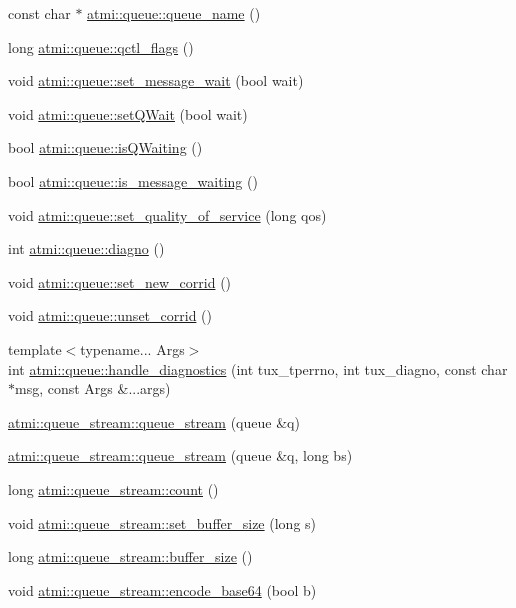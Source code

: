 \begin{DoxyCompactItemize}
\item 
const char $\ast$ \hyperlink{group__atmi_gadaddc33c75ec6e13f6c57da8d979ad32}{atmi\+::queue\+::queue\+\_\+name} ()
\item 
long \hyperlink{group__atmi_ga96f51996c857985c9b8e1b720f726f0c}{atmi\+::queue\+::qctl\+\_\+flags} ()
\item 
void \hyperlink{group__atmi_ga9669776889226a450093d2ddfd921d4b}{atmi\+::queue\+::set\+\_\+message\+\_\+wait} (bool wait)
\item 
void \hyperlink{group__atmi_ga223fac7945fb8d87f04189aa77ce666a}{atmi\+::queue\+::set\+Q\+Wait} (bool wait)
\item 
bool \hyperlink{group__atmi_ga90f5a71979755634b1e625d45ac61412}{atmi\+::queue\+::is\+Q\+Waiting} ()
\item 
bool \hyperlink{group__atmi_gac655db1db167f3e833f4fa84e6256428}{atmi\+::queue\+::is\+\_\+message\+\_\+waiting} ()
\item 
void \hyperlink{group__atmi_ga0fbca137aadc2946b8f3889b76352af9}{atmi\+::queue\+::set\+\_\+quality\+\_\+of\+\_\+service} (long qos)
\item 
int \hyperlink{group__atmi_ga1fabff1d9a56389a41f92542561d570d}{atmi\+::queue\+::diagno} ()
\item 
void \hyperlink{group__atmi_ga2c0511c9f17e939789c5290fe83d1f1f}{atmi\+::queue\+::set\+\_\+new\+\_\+corrid} ()
\item 
void \hyperlink{group__atmi_gaa74de8091c32580972e7871e7ddf786c}{atmi\+::queue\+::unset\+\_\+corrid} ()
\item 
{\footnotesize template$<$typename... Args$>$ }\\int \hyperlink{group__atmi_ga767f80e22a52d4b325d5a5aadc27a343}{atmi\+::queue\+::handle\+\_\+diagnostics} (int tux\+\_\+tperrno, int tux\+\_\+diagno, const char $\ast$msg, const Args \&...args)
\item 
\hyperlink{group__atmi_ga4d7ccf78c5bb515968b294d374b8c46a}{atmi\+::queue\+\_\+stream\+::queue\+\_\+stream} (queue \&q)
\item 
\hyperlink{group__atmi_ga3521fdad3d06d829f2c1370e3e6819e0}{atmi\+::queue\+\_\+stream\+::queue\+\_\+stream} (queue \&q, long bs)
\item 
long \hyperlink{group__atmi_gac4f1e88530a4d9fda0bc4b271301866b}{atmi\+::queue\+\_\+stream\+::count} ()
\item 
void \hyperlink{group__atmi_ga500b658e3f3f1a353982a1304ea27801}{atmi\+::queue\+\_\+stream\+::set\+\_\+buffer\+\_\+size} (long s)
\item 
long \hyperlink{group__atmi_ga18d01411c5ffeffd190195fd2b4dc61a}{atmi\+::queue\+\_\+stream\+::buffer\+\_\+size} ()
\item 
void \hyperlink{group__atmi_ga4a47e7caf329e46c31f44425e3ceb6e3}{atmi\+::queue\+\_\+stream\+::encode\+\_\+base64} (bool b)
\end{DoxyCompactItemize}

